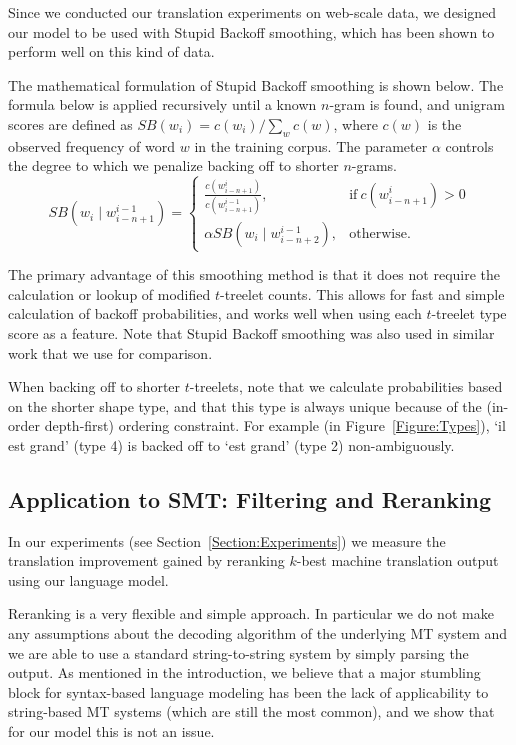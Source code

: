 \documentclass[english]{jnlp_1.4}
\begin{document}
Since we conducted our translation experiments on web-scale data, we designed our
model to be used with Stupid Backoff \cite{Brants07} smoothing, which has been shown
to perform well on this kind of data.

The mathematical formulation of Stupid Backoff smoothing is shown below. The formula
below is applied
recursively until a known $n$-gram is found, and unigram scores are defined as
$SB(w_i) = c(w_i) / \sum_w c(w)$, where $c(w)$ is the observed frequency of word $w$ in the
training corpus. The parameter
$\alpha$ controls the degree to which we penalize backing off to shorter $n$-grams.
\begin{equation}
    SB(w_i \mid w^{i-1}_{i-n+1}) = 
    \begin{cases}
        \frac{c(w^i_{i-n+1})}{c(w^{i-1}_{i-n+1})}, & \text{if}\ c(w^i_{i-n+1}) > 0\\
        \alpha SB(w_i \mid w^{i-1}_{i-n+2}), & \text{otherwise}.
    \end{cases}
\end{equation}

The primary advantage of this smoothing
method is that it does not require the calculation or lookup of modified $t$-treelet counts.
This allows for fast and simple calculation of backoff probabilities, and works well
when using each $t$-treelet type score as a feature.
Note that Stupid Backoff smoothing was also
used in similar work \cite{Gubbins13} that we use for comparison.

When backing off to shorter $t$-treelets, note that we calculate probabilities based on the
shorter shape type, and that this type is always unique because of the (in-order depth-first)
ordering constraint. For example (in Figure~\ref{Figure:Types}), `il est grand' (type 4) is
backed off to `est grand' (type 2) non-ambiguously.


\subsection{Application to SMT: Filtering and Reranking}
\label{Section:Filtering}

In our experiments (see Section~\ref{Section:Experiments}) we measure the translation
improvement gained by reranking $k$-best machine translation output using our
language model.

Reranking is a very flexible and simple approach.
In particular we do not make any assumptions about the
decoding algorithm of the underlying MT system and we are able to use a standard string-to-string system
by simply parsing the output. As mentioned in the introduction, we believe that a
major stumbling block for syntax-based language modeling has been the lack of
applicability to string-based MT systems (which are still the most common), and
we show that for our model this is not an issue.
\end{document}
